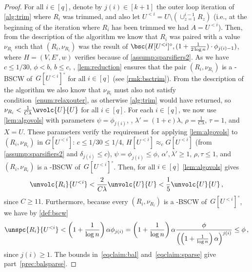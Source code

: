 \begin{proof}
	For all $i \in [q]$, denote by $j(i) \in [k+1]$ the outer loop iteration of \cref{alg:trim} where $R_i$ was trimmed, and also let $U^{<i}=U \setminus (\cup_{z=1}^{i-1} R_z)$ (i.e., at the beginning of the iteration where $R_i$ has been trimmed we had $A = U^{<i}$). Then, from the description of the algorithm we know that $R_i$ was paired with a value $\nu_{R_i}$ such that $(R_i,\nu_{R_i})$ was the result of $\bsc(H[U^{<i}]^\circ, (1+\frac{1}{2\log n}) \cdot \phi_{j(i)-1})$, where $H=(V,E',w)$ verifies  because of \cref{assump:sparsifiers2}. As we have $ c\le 1/30$, $\phi < b$, $b \le c$, , \cref{lem:reduction} ensures that the pair $(R_i,\nu_{R_i})$ is a -BSCW of~$G[U^{<i}]^\circ$ for all $i \in [q]$ (see \cref{rmk:bsctrim}).  From the description of the algorithm  we also know that $\nu_{R_i}$ must also not satisfy condition~\eqref{enum:relaxouter}, as otherwise \cref{alg:trim} would have returned, so $\nu_{R_i} < \frac{1}{C \lambda}\wvolc{U}{U}$ for all $i \in [q]$. For each $i \in [q]$, we now use \cref{lem:algovols} with parameters $\psi=\phi_{j(i)}$, , $\lambda' =(1+c)\lambda$, $\rho = \frac{1}{C\lambda}$, $\tau=1$, and $X=U$. These parameters verify the requirement for applying \cref{lem:algovols} to $(R_i,\nu_{R_i})$ in $G[U^{<i}]$: $ c\le 1/30 \le 1/4$, $H[U^{<i}] \approx_{c} G[U^{<i}]$ (from \cref{assump:sparsifiers2} and $\delta_{j(i)} \le c$), $\psi=\phi_{j(i)}\le \phi$, $\alpha',\lambda' \ge 1$, $\rho,\tau \le 1$, and $(R_i,\nu_{R_i})$ is a -BSCW of~$G[U^{<i}]^\circ$. Then, for all $i \in [q]$ \cref{lem:algovols} gives
	\begin{equation}
		\label{eqclaim:bal}
		\unvolc{R_i}{U^{<i}} < \frac{2}{C\lambda}\unvolc{U}{U} < \frac{1}{5}\unvolc{U}{U}\, ,
	\end{equation}
	since $C \ge 11$.
	Furthermore, because every $(R_i,\nu_{R_i})$ is a -BSCW of~$G[U^{<i}]^\circ$, we have by \cref{def:bscw}
	\begin{equation}
		\label{eqclaim:sparse}
		\unspc{R_i}{U^{<i}} < \left(1+\frac{1}{ \log n}\right) \alpha \phi_{j(i)} = \left(1+\frac{1}{ \log n}\right) \alpha \frac{\phi}{\left( \left(1+\frac{1}{ \log n}\right) \alpha\right)^{j(i)}}  \le \phi \, ,
	\end{equation}
	since $j(i) \ge 1$. The bounds in~\eqref{eqclaim:bal} and~\eqref{eqclaim:sparse} give part~\eqref{prec:balsparse}.
\end{proof}

